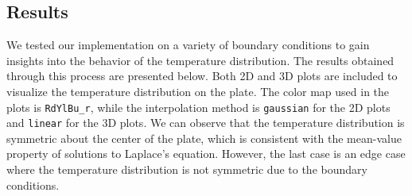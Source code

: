 \documentclass{article}
\begin{document}
\begin{multicols}{2}
\section{Results}
We tested our implementation on a variety of boundary conditions to gain
insights into the behavior of the temperature distribution. The results obtained
through this process are presented below. Both 2D and 3D plots are included to
visualize the temperature distribution on the plate. The color map used in the
plots is \texttt{RdYlBu\_r}, while the interpolation method is \texttt{gaussian}
for the 2D plots and \texttt{linear} for the 3D plots. We can observe that the
temperature distribution is symmetric about the center of the plate, which is
consistent with the mean-value property of solutions to Laplace's equation.
However, the last case is an edge case where the temperature distribution is not
symmetric due to the boundary conditions.
\end{multicols}
\end{document}
